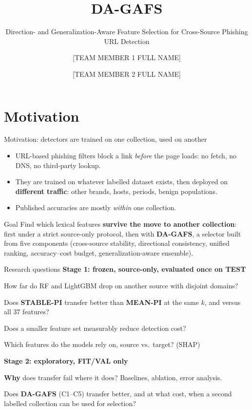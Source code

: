 \documentclass[aspectratio=169,10pt]{beamer}
\title{DA-GAFS}
\subtitle{Direction- and Generalization-Aware Feature Selection for Cross-Source Phishing URL Detection}
\author{[TEAM MEMBER 1 FULL NAME] \and [TEAM MEMBER 2 FULL NAME]}
\institute{Project category: General Machine Learning (application project)}
\date{}
\newcommand{\key}[1]{{\color{acc}\textbf{#1}}}
\begin{document}
\begin{frame}
\titlepage
\end{frame}

\section{Motivation}
\begin{frame}{Motivation: detectors are trained on one collection, used on another}
\begin{itemize}
\item URL-based phishing filters block a link \emph{before} the page loads: no fetch, no DNS, no third-party lookup.
\item They are trained on whatever labelled dataset exists, then deployed on \key{different traffic}: other brands, hosts, periods, benign populations.
\item Published accuracies are mostly \emph{within} one collection.
\end{itemize}
\vspace{1em}
\begin{block}{Goal}
Find which lexical features \key{survive the move to another collection}: first under a strict source-only protocol, then with \key{DA-GAFS}, a selector built from five components (cross-source stability, directional consistency, unified ranking, accuracy--cost budget, generalization-aware ensemble).
\end{block}
\end{frame}

\begin{frame}{Research questions}
\small
\textbf{Stage 1: frozen, source-only, evaluated once on TEST}
\begin{description}[RQ5]
\item[RQ1] How far do RF and LightGBM drop on another source with disjoint domains?
\item[RQ2] Does \key{STABLE-PI} transfer better than \key{MEAN-PI} at the same $k$, and versus all 37 features?
\item[RQ3] Does a smaller feature set measurably reduce detection cost?
\item[RQ4] Which features do the models rely on, source vs.\ target? (SHAP)
\end{description}
\textbf{Stage 2: exploratory, FIT/VAL only}
\begin{description}[RQ5]
\item[RQ5] \key{Why} does transfer fail where it does? Baselines, ablation, error analysis.
\item[RQ6] Does \key{DA-GAFS} (C1--C5) transfer better, and at what cost, when a second labelled collection can be used for selection?
\end{description}
\end{frame}
\end{document}

